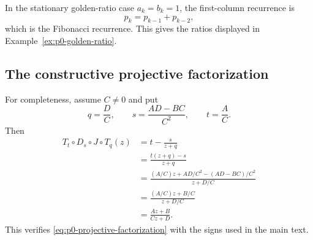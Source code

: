 In the stationary golden-ratio case $a_k=b_k=1$, the first-column recurrence is
\[
  p_k=p_{k-1}+p_{k-2},
\]
which is the Fibonacci recurrence.  This gives the ratios displayed in
Example~\ref{ex:p0-golden-ratio}.

\subsection{The constructive projective factorization}

For completeness, assume $C\ne0$ and put
\[
  q=\frac DC,
  \qquad
  s=\frac{AD-BC}{C^2},
  \qquad
  t=\frac AC.
\]
Then
\begin{align*}
  T_t\circ D_s\circ J\circ T_q(z)
  &=t-\frac{s}{z+q}\\
  &=\frac{t(z+q)-s}{z+q}\\
  &=\frac{(A/C)z+AD/C^2-(AD-BC)/C^2}{z+D/C}\\
  &=\frac{(A/C)z+B/C}{z+D/C}\\
  &=\frac{Az+B}{Cz+D}.
\end{align*}
This verifies \eqref{eq:p0-projective-factorization} with the signs used in
the main text.
